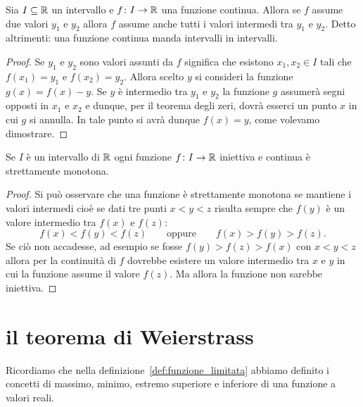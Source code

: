 \begin{corollary}
\mymark{**}
Sia $I\subseteq \mathbb R$ un intervallo e $f\colon I \to \mathbb R$ una
funzione continua.
Allora se $f$ assume due valori $y_1$ e $y_2$ allora $f$
assume anche tutti i valori intermedi tra $y_1$ e $y_2$.
Detto altrimenti: una funzione continua
manda intervalli in intervalli.
\end{corollary}
%
\begin{proof}
Se $y_1$ e $y_2$ sono valori assunti da $f$ significa
che esistono $x_1,x_2 \in I$ tali che $f(x_1)= y_1$ e $f(x_2)=y_2$.
Allora scelto $y$ si consideri la funzione $g(x) = f(x)-y$.
Se $y$ è intermedio tra $y_1$ e $y_2$ la funzione $g$ assumerà
segni opposti in $x_1$ e $x_2$ e dunque, per il teorema degli zeri,
dovrà esserci un punto $x$ in cui $g$ si annulla. In tale punto
si avrà dunque $f(x)=y$, come volevamo dimostrare.
\end{proof}

\begin{lemma}
Se $I$ è un intervallo di $\mathbb R$ ogni funzione $f\colon I \to \mathbb R$
iniettiva e continua è strettamente monotona.
\end{lemma}
%
\begin{proof}
Si può osservare che una funzione è strettamente monotona se mantiene i valori
intermedi cioè se dati tre punti
$x<y<z$ risulta sempre che $f(y)$ è un valore intermedio tra $f(x)$ e $f(z)$:
\[
  f(x)< f(y) <f(z) \qquad\text{oppure} \qquad f(x)> f(y) > f(z).
\]
Se ciò non accadesse, ad esempio se fosse $f(y)>f(z)>f(x)$ con $x<y<z$
allora per la continuità di $f$ dovrebbe esistere un valore intermedio
tra $x$ e $y$ in cui la funzione assume il valore $f(z)$. Ma allora la funzione
non sarebbe iniettiva.
\end{proof}

\section{il teorema di Weierstrass}

Ricordiamo che nella definizione~\ref{def:funzione_limitata}
abbiamo definito i concetti di massimo, minimo, estremo superiore
e inferiore di una funzione a valori reali.


